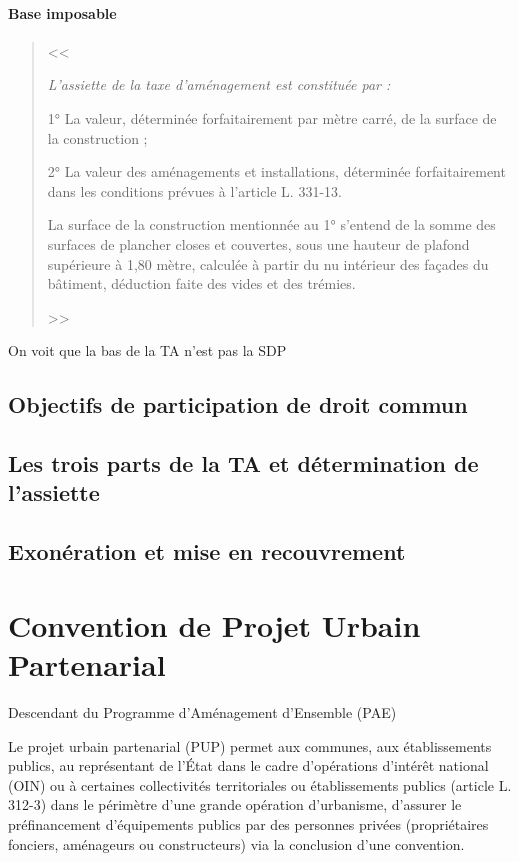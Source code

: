 	\paragraph{Base imposable }
	
	\begin{quote}
		\textbf{}
		
		<< {\itshape L'assiette de la taxe d'aménagement est constituée par :
			
			1° La valeur, déterminée forfaitairement par mètre carré, de la surface de la construction ;
			
			2° La valeur des aménagements et installations, déterminée forfaitairement dans les conditions prévues à l'article L. 331-13.
			
			La surface de la construction mentionnée au 1° s'entend de la somme des surfaces de plancher closes et couvertes, sous une hauteur de plafond supérieure à 1,80 mètre, calculée à partir du nu intérieur des façades du bâtiment, déduction faite des vides et des trémies.} >>
	\end{quote}
	On voit que  la bas de la TA n'est pas la SDP
	
	\subsection{Objectifs de participation de droit commun}
	
	\subsection{Les trois parts de la TA et détermination de l'assiette}
	
	\subsection{Exonération et mise en recouvrement}
	
\section{Convention de Projet Urbain Partenarial}

	Descendant du Programme d’Aménagement d’Ensemble (PAE)
	
	Le projet urbain partenarial (PUP) permet aux communes, aux établissements publics, au représentant de l’État dans le cadre d’opérations d’intérêt national (OIN) ou à certaines collectivités territoriales ou établissements publics (article L. 312-3) dans le périmètre d'une grande opération d'urbanisme, d’assurer le préfinancement d’équipements publics par des personnes privées (propriétaires fonciers, aménageurs ou constructeurs) via la conclusion d’une convention.
	
